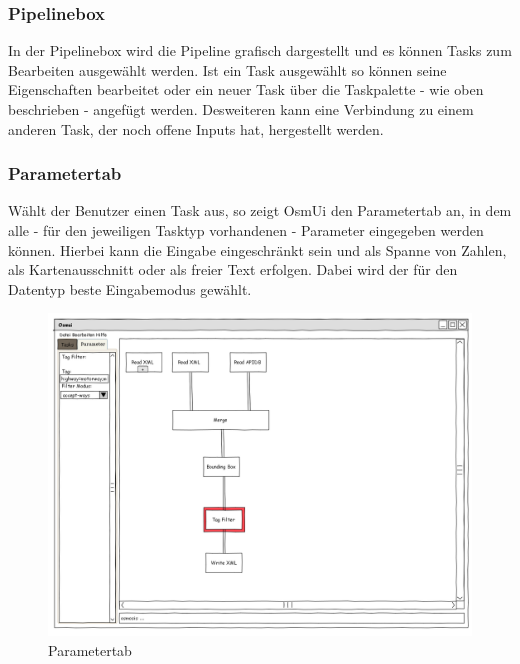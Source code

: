 \documentclass[a4paper,12pt]{scrartcl}
\begin{document}
\subsubsection{Pipelinebox}
In der Pipelinebox wird die Pipeline grafisch dargestellt und es können Tasks zum Bearbeiten ausgewählt werden. Ist ein Task ausgewählt so können seine Eigenschaften
bearbeitet oder ein neuer Task über die Taskpalette - wie oben beschrieben - angefügt werden. Desweiteren kann eine Verbindung zu einem anderen Task, der noch offene
Inputs hat, hergestellt werden.
\subsubsection{Parametertab}
Wählt der Benutzer einen Task aus, so zeigt OsmUi den Parametertab an, in dem alle - für den jeweiligen Tasktyp vorhandenen - Parameter eingegeben werden können.
Hierbei kann die Eingabe eingeschränkt sein und als Spanne von Zahlen, als Kartenausschnitt oder als freier Text erfolgen. Dabei wird der für den Datentyp beste Eingabemodus gewählt.\\
\begin{center}
\begin{figure}[h!]
\begin{center}
\includegraphics[width=15cm]{ui_prototype/OsmUi_Parameter_Optionen.png}
\caption{Parametertab}
\end{center}
\end{figure}
\end{center}
\end{document}
